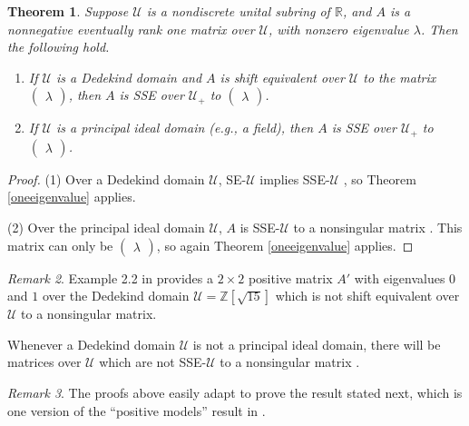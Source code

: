 \documentclass{amsart}
\newtheorem{theorem}{Theorem}[section]
\theoremstyle{definition}
\theoremstyle{remark}
\newtheorem{remark}[theorem]{Remark}
\numberwithin{equation}{section}
\begin{document}
{{\begin{theorem} \label{dedekindtheorem}
Suppose 
$\mathcal U$ is a nondiscrete unital subring of $\mathbb R$, 
 and $A$ is a nonnegative 
eventually rank one matrix over $\mathcal U$, with nonzero 
eigenvalue $\lambda$. Then the following hold. 
\begin{enumerate} 
\item 
If 
$\mathcal U$ is a Dedekind domain and $A$ is shift equivalent 
over $\mathcal U$ 
to the matrix $\begin{pmatrix}\lambda\end{pmatrix}$, then 
$A$ is SSE over $\mathcal U_+$ to $\begin{pmatrix}\lambda\end{pmatrix}$. 
\item 
If $\mathcal U$ is a principal ideal domain (e.g., 
a field), then $A$ is SSE over $\mathcal U_+$ to 
$\begin{pmatrix}\lambda\end{pmatrix}$. 
\end{enumerate} 
\end{theorem} 

\begin{proof} 
(1) Over a Dedekind domain $\mathcal U$, SE-$\mathcal U$ implies 
SSE-$\mathcal U$ \cite[Prop. 2.4]{BH2}, 
so Theorem \ref{oneeigenvalue} applies. 

(2) Over the principal ideal domain $\mathcal U$, 
$A$ is SSE-$\mathcal U$ to a nonsingular matrix 
\cite{E,Wi2}. 
This matrix can only be 
$\begin{pmatrix}\lambda\end{pmatrix}$, 
so again  
Theorem \ref{oneeigenvalue} applies. 
\end{proof} 

\begin{remark} \label{dedekindremark}
Example 2.2  in \cite{BH2} provides a
$2\times 2$ positive matrix 
$A'$ with eigenvalues $0$ and $1$ over the 
Dedekind domain $\mathcal U=\mathbb Z[\sqrt{15}]$ 
which is not shift equivalent over $\mathcal U$ 
 to a nonsingular matrix. 

Whenever a 
Dedekind domain $\mathcal U$  
is not a principal ideal domain, there will be matrices 
over $\mathcal U$ which are not SSE-$\mathcal U$ to 
a nonsingular matrix \cite{BH2}.
\end{remark}

\begin{remark} The proofs above 
easily adapt to prove the result stated next, 
which is one version of the  ``positive models'' result 
 in \cite{KR4}. 
\end{remark} 

}}
\end{document}
